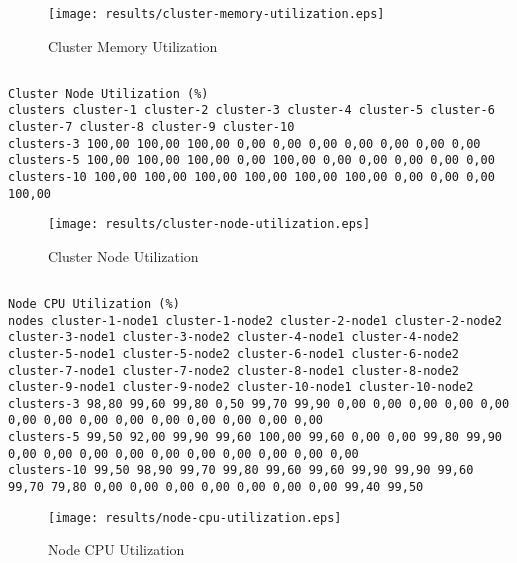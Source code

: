 \documentclass{elsart}
\begin{document}
\begin{figure}[ht]
\centering
\texttt{[image: results/cluster-memory-utilization.eps]}
\caption{Cluster Memory Utilization}\label{fig:cluster-memory-utilization.eps}
\end{figure}

\subsection{}

\begin{lstlisting}[caption={Cluster Node Utilization}]
Cluster Node Utilization (%)
clusters cluster-1 cluster-2 cluster-3 cluster-4 cluster-5 cluster-6 cluster-7 cluster-8 cluster-9 cluster-10
clusters-3 100,00 100,00 100,00 0,00 0,00 0,00 0,00 0,00 0,00 0,00
clusters-5 100,00 100,00 100,00 0,00 100,00 0,00 0,00 0,00 0,00 0,00
clusters-10 100,00 100,00 100,00 100,00 100,00 100,00 0,00 0,00 0,00 100,00
\end{lstlisting}

\begin{figure}[ht]
\centering
\texttt{[image: results/cluster-node-utilization.eps]}
\caption{Cluster Node Utilization}\label{fig:cluster-node-utilization.eps}
\end{figure}

\subsection{}

\begin{lstlisting}[caption={Node CPU Utilization}]
Node CPU Utilization (%)
nodes cluster-1-node1 cluster-1-node2 cluster-2-node1 cluster-2-node2 cluster-3-node1 cluster-3-node2 cluster-4-node1 cluster-4-node2 cluster-5-node1 cluster-5-node2 cluster-6-node1 cluster-6-node2 cluster-7-node1 cluster-7-node2 cluster-8-node1 cluster-8-node2 cluster-9-node1 cluster-9-node2 cluster-10-node1 cluster-10-node2
clusters-3 98,80 99,60 99,80 0,50 99,70 99,90 0,00 0,00 0,00 0,00 0,00 0,00 0,00 0,00 0,00 0,00 0,00 0,00 0,00 0,00
clusters-5 99,50 92,00 99,90 99,60 100,00 99,60 0,00 0,00 99,80 99,90 0,00 0,00 0,00 0,00 0,00 0,00 0,00 0,00 0,00 0,00
clusters-10 99,50 98,90 99,70 99,80 99,60 99,60 99,90 99,90 99,60 99,70 79,80 0,00 0,00 0,00 0,00 0,00 0,00 0,00 99,40 99,50
\end{lstlisting}

\begin{figure}[ht]
\centering
\texttt{[image: results/node-cpu-utilization.eps]}
\caption{Node CPU Utilization}\label{fig:node-cpu-utilization.eps}
\end{figure}
\end{document}
